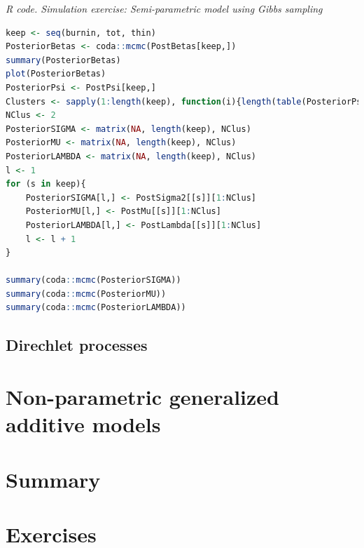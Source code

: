 \begin{tcolorbox}[enhanced,width=4.67in,center upper,
	fontupper=\large\bfseries,drop shadow southwest,sharp corners]
	\textit{R code. Simulation exercise: Semi-parametric model using Gibbs sampling}
	\begin{VF}
		\begin{lstlisting}[language=R]
keep <- seq(burnin, tot, thin)
PosteriorBetas <- coda::mcmc(PostBetas[keep,])
summary(PosteriorBetas)
plot(PosteriorBetas)
PosteriorPsi <- PostPsi[keep,]
Clusters <- sapply(1:length(keep), function(i){length(table(PosteriorPsi[i,]))})
NClus <- 2
PosteriorSIGMA <- matrix(NA, length(keep), NClus)
PosteriorMU <- matrix(NA, length(keep), NClus)
PosteriorLAMBDA <- matrix(NA, length(keep), NClus)
l <- 1
for (s in keep){
	PosteriorSIGMA[l,] <- PostSigma2[[s]][1:NClus]
	PosteriorMU[l,] <- PostMu[[s]][1:NClus]
	PosteriorLAMBDA[l,] <- PostLambda[[s]][1:NClus]
	l <- l + 1
}

summary(coda::mcmc(PosteriorSIGMA))
summary(coda::mcmc(PosteriorMU))
summary(coda::mcmc(PosteriorLAMBDA))
\end{lstlisting}
	\end{VF}
\end{tcolorbox}


\subsection{Direchlet processes}\label{sec11_12}

\section{Non-parametric generalized additive models}\label{sec11_2}

\section{Summary}\label{sec11_3}

\section{Exercises}\label{sec11_4}

